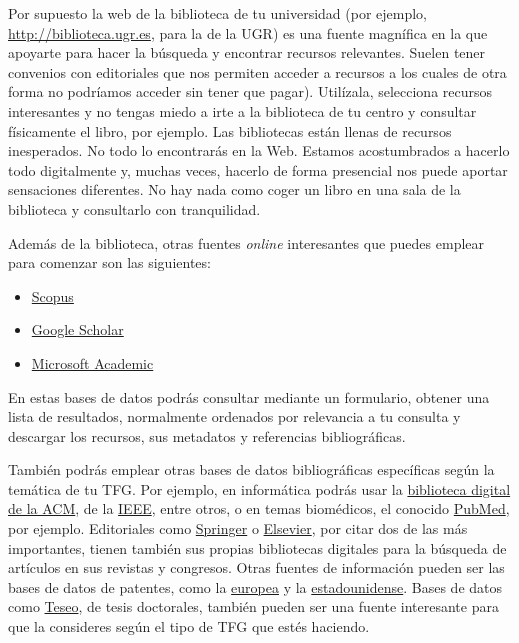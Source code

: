 Por supuesto la web de la biblioteca de tu universidad (por ejemplo, \url{http://biblioteca.ugr.es}, para la de la UGR) es una fuente magnífica en la que apoyarte para hacer la búsqueda y encontrar recursos relevantes. Suelen tener convenios con editoriales que nos permiten acceder a recursos a los cuales de otra forma no podríamos acceder sin tener que pagar). Utilízala, selecciona recursos interesantes y no tengas miedo a irte a la biblioteca de tu centro y consultar físicamente el libro, por ejemplo. Las bibliotecas están llenas de recursos inesperados. No todo lo encontrarás en la Web. Estamos acostumbrados a hacerlo todo digitalmente y, muchas veces, hacerlo de forma presencial nos puede aportar sensaciones diferentes. No hay nada como coger un libro en una sala de la biblioteca y consultarlo con tranquilidad. 

Además de la biblioteca, otras fuentes \textit{online} interesantes que puedes emplear para comenzar son las siguientes:

\begin{itemize}
    \item \href{www.scopus.com}{Scopus}
    \item \href{https://scholar.google.es}{Google Scholar}
    \item \href{https://www.microsoft.com/en-us/research/project/academic}{Microsoft Academic}
\end{itemize}

En estas bases de datos podrás consultar mediante un formulario, obtener una lista de resultados, normalmente ordenados por relevancia a tu consulta y descargar los recursos, sus metadatos y referencias bibliográficas.

También podrás emplear otras bases de datos bibliográficas específicas según la temática de tu TFG. Por ejemplo, en informática podrás usar la \href{https://dl.acm.org}{biblioteca digital de la ACM}, de la \href{https://ieeexplore.ieee.org}{IEEE}, entre otros, o en temas biomédicos, el conocido \href{https://pubmed.ncbi.nlm.nih.gov/}{PubMed}, por ejemplo. Editoriales como \href{https://link.springer.com}{Springer} o \href{https://www.sciencedirect.com}{Elsevier}, por citar dos de las más importantes, tienen también sus propias bibliotecas digitales para la búsqueda de artículos en sus revistas y congresos. Otras fuentes de información pueden ser las bases de datos de patentes, como la \href{https://worldwide.espacenet.com}{europea} y la \href{https://ppubs.uspto.gov/pubwebapp/static/pages/landing.html}{estadounidense}. Bases de datos como \href{https://www.educacion.gob.es/teseo}{Teseo}, de tesis doctorales, también pueden ser una fuente interesante para que la consideres según el tipo de TFG que estés haciendo.

